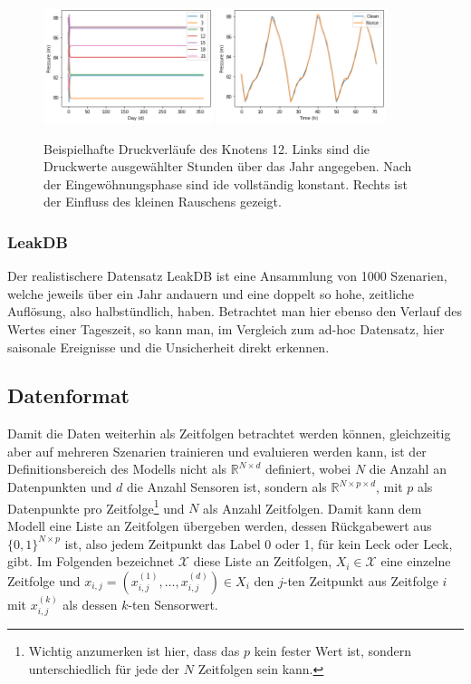 \begin{figure}[h]
    \centering
    \includegraphics[width=0.44\textwidth]{res/practice-noise-days.png}
    \includegraphics[width=0.44\textwidth]{res/practice-noise-applied.png}
    \caption{Beispielhafte Druckverläufe des Knotens 12. Links sind die Druckwerte ausgewählter Stunden über das
        Jahr angegeben. Nach der Eingewöhnungsphase sind ide vollständig konstant. Rechts ist der Einfluss des
        kleinen Rauschens gezeigt.}
    \label{fig:practice-noise}
\end{figure}

\subsubsection*{LeakDB}

Der realistischere Datensatz LeakDB ist eine Ansammlung von 1000 Szenarien, welche jeweils über ein Jahr andauern
 und eine doppelt so hohe, zeitliche Auflösung, also halbstündlich, haben. Betrachtet man hier ebenso den Verlauf
 des Wertes einer Tageszeit, so kann man, im Vergleich zum ad-hoc Datensatz, hier saisonale Ereignisse und die
 Unsicherheit direkt erkennen.

\subsection*{Datenformat}

Damit die Daten weiterhin als Zeitfolgen betrachtet werden können, gleichzeitig aber auf mehreren Szenarien
 trainieren und evaluieren werden kann, ist der Definitionsbereich des Modells nicht als $\mathbb{R}^{N \times d}$
 definiert, wobei $N$ die Anzahl an Datenpunkten und $d$ die Anzahl Sensoren ist, sondern als
 $\mathbb{R}^{N \times p \times d}$, mit $p$ als Datenpunkte pro Zeitfolge\footnote{Wichtig anzumerken ist hier,
 dass das $p$ kein fester Wert ist, sondern unterschiedlich für jede der $N$ Zeitfolgen sein kann.} und $N$
 als Anzahl Zeitfolgen. Damit kann dem Modell eine Liste an Zeitfolgen übergeben werden,
 dessen Rückgabewert aus $\{0, 1\}^{N \times p}$ ist, also jedem Zeitpunkt das Label 0 oder 1, für kein Leck
 oder Leck, gibt. Im Folgenden bezeichnet $\mathcal{X}$ diese Liste an Zeitfolgen,
 $X_i \in \mathcal{X}$ eine einzelne Zeitfolge und $x_{i, j} = (x_{i, j}^{(1)}, \dots, x_{i, j}^{(d)}) \in X_i$ den $j$-ten
 Zeitpunkt aus Zeitfolge $i$ mit $x_{i, j}^{(k)}$ als dessen $k$-ten Sensorwert.

